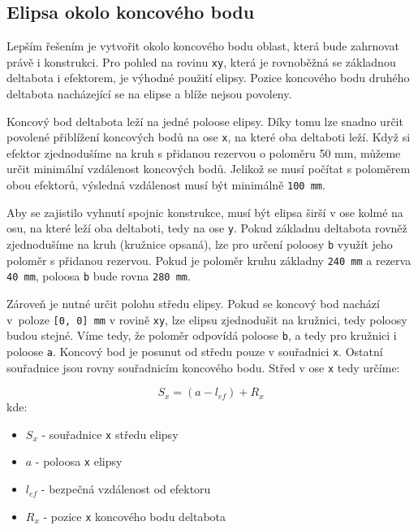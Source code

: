     \subsection{Elipsa okolo koncového bodu}
        Lepším řešením je vytvořit okolo koncového bodu oblast, která bude zahrnovat právě 
        i konstrukci. Pro pohled na rovinu \texttt{xy}, která je rovnoběžná se základnou 
        deltabota i efektorem, je výhodné použití elipsy. Pozice koncového bodu druhého 
        deltabota nacházející se na elipse a blíže nejsou povoleny.
        
        Koncový bod deltabota leží na jedné poloose elipsy. Díky tomu lze snadno určit 
        povolené přiblížení koncových bodů na ose \texttt{x}, na které oba deltaboti leží. 
        Když si efektor zjednodušíme na kruh s přidanou rezervou o poloměru 50 mm, můžeme 
        určit minimální vzdálenost koncových bodů. Jelikož se musí počítat s poloměrem 
        obou efektorů, výsledná vzdálenost musí být minimálně \texttt{100 mm}. 

        Aby se zajistilo vyhnutí spojnic konstrukce, musí být elipsa širší v ose kolmé na
        osu, na které leží oba deltaboti, tedy na ose \texttt{y}. Pokud základnu deltabota
        rovněž zjednodušíme na kruh (kružnice opsaná), lze pro určení poloosy \texttt{b}
        využít jeho poloměr s přidanou rezervou. Pokud je poloměr kruhu základny 
        \texttt{240 mm} a rezerva \texttt{40 mm}, poloosa \texttt{b} bude rovna 
        \texttt{280 mm}.

        Zároveň je nutné určit polohu středu elipsy. Pokud se koncový bod nachází v~poloze
        \texttt{[0, 0] mm} v rovině \texttt{xy}, lze elipsu zjednodušit na kružnici, tedy 
        poloosy budou stejné. Víme tedy, že poloměr odpovídá poloose \texttt{b}, a tedy
        pro kružnici i poloose \texttt{a}. Koncový bod je posunut od středu pouze v 
        souřadnici \texttt{x}. Ostatní souřadnice jsou rovny souřadnicím koncového bodu. 
        Střed v ose \texttt{x} tedy určíme:

        \begin{equation}
            S_x = (a-l_{ef}) + R_x 
            \label{eq:stred_elipsy_PB}
        \end{equation}
        kde: 
        \begin{itemize}
            \item []$S_x$ - souřadnice \texttt{x} středu elipsy
            \item []$a$ - poloosa \texttt{x} elipsy
            \item []$l_{ef}$ - bezpečná vzdálenost od efektoru
            \item []$R_x$ - pozice \texttt{x} koncového bodu deltabota
        \end{itemize}
        \hspace{1em}
        
